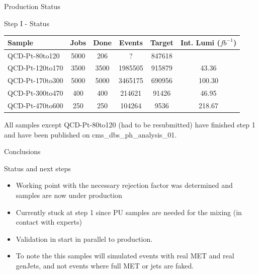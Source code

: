 \documentclass[8pt]{beamer}
\begin{document}
\begin{frame}{Production Status}
 
\begin{block}{Step I - Status}

\centering
\begin{tabular}{|l||c|c|c|c|c|}
\hline
Sample          & Jobs & Done &  Events & Target & Int. Lumi ($fb^{-1}$) \\
\hline \hline
QCD-Pt-80to120  & 5000 &  206 &       ? & 847618 &  \\
QCD-Pt-120to170 & 3500 & 3500 & 1985505 & 915879 &  43.36 \\
QCD-Pt-170to300 & 5000 & 5000 & 3465175 & 690956 & 100.30 \\
QCD-Pt-300to470 &  400 &  400 &  214621 &  91426 &  46.95 \\
QCD-Pt-470to600 &  250 &  250 &  104264 &   9536 & 218.67 \\
\hline
\end{tabular}

\end{block}

All samples except QCD-Pt-80to120 (had to be resubmitted) have finished step 1 and have been published on cms\_dbs\_ph\_analysis\_01.

\end{frame}

\begin{frame}{Conclusions}

\begin{block}{Status and next steps}

\begin{itemize}
  \item Working point with the necessary rejection factor was determined and samples are now under production
  \item Currently stuck at step 1 since PU samples are needed for the mixing (in contact with experts)
  \item Validation in start in parallel to production.
  \item To note the this samples will simulated events with real MET and real genJets, and not events where full MET or jets are faked.
\end{itemize} 

\end{block}

\end{frame}
\end{document}
